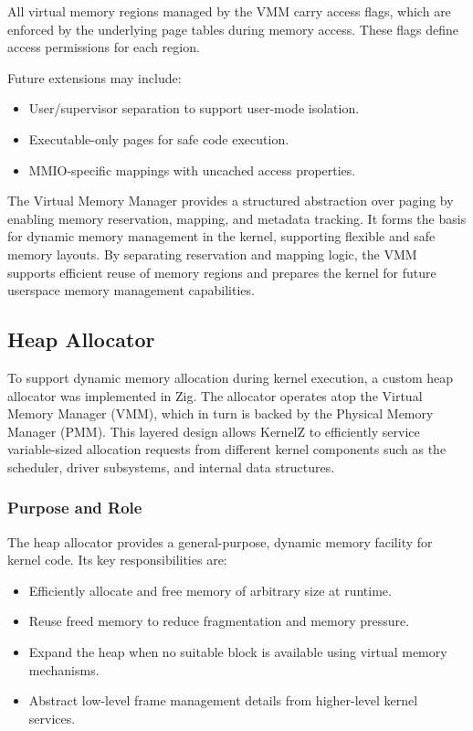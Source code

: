 \documentclass[12pt]{extarticle}
\begin{document}
All virtual memory regions managed by the VMM carry access flags, which are enforced by the underlying page tables during memory access. These flags define access permissions for each region.

Future extensions may include:
\begin{itemize}
  \item User/supervisor separation to support user-mode isolation.
  \item Executable-only pages for safe code execution.
  \item MMIO-specific mappings with uncached access properties.
\end{itemize}



The Virtual Memory Manager provides a structured abstraction over paging by enabling memory reservation, mapping, and metadata tracking. It forms the basis for dynamic memory management in the kernel, supporting flexible and safe memory layouts. By separating reservation and mapping logic, the VMM supports efficient reuse of memory regions and prepares the kernel for future userspace memory management capabilities.
\pagebreak
\subsection{Heap Allocator}

To support dynamic memory allocation during kernel execution, a custom heap allocator was implemented in Zig. The allocator operates atop the Virtual Memory Manager (VMM), which in turn is backed by the Physical Memory Manager (PMM). This layered design allows KernelZ to efficiently service variable-sized allocation requests from different kernel components such as the scheduler, driver subsystems, and internal data structures.

\subsubsection*{Purpose and Role}

The heap allocator provides a general-purpose, dynamic memory facility for kernel code. Its key responsibilities are:

\begin{itemize}
    \item Efficiently allocate and free memory of arbitrary size at runtime.
    \item Reuse freed memory to reduce fragmentation and memory pressure.
    \item Expand the heap when no suitable block is available using virtual memory mechanisms.
    \item Abstract low-level frame management details from higher-level kernel services.
\end{itemize}
\end{document}
